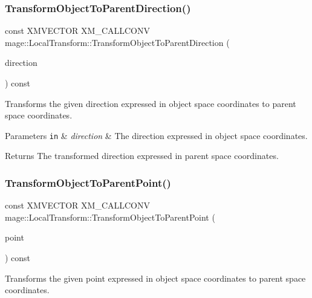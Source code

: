 \subsubsection{\texorpdfstring{Transform\+Object\+To\+Parent\+Direction()}{TransformObjectToParentDirection()}}
{\footnotesize\ttfamily const X\+M\+V\+E\+C\+T\+OR X\+M\+\_\+\+C\+A\+L\+L\+C\+O\+NV mage\+::\+Local\+Transform\+::\+Transform\+Object\+To\+Parent\+Direction (\begin{DoxyParamCaption}\item[{F\+X\+M\+V\+E\+C\+T\+OR}]{direction }\end{DoxyParamCaption}) const\hspace{0.3cm}{\ttfamily [noexcept]}}

Transforms the given direction expressed in object space coordinates to parent space coordinates.


\begin{DoxyParams}[1]{Parameters}
\mbox{\tt in}  & {\em direction} & The direction expressed in object space coordinates. \\
\hline
\end{DoxyParams}
\begin{DoxyReturn}{Returns}
The transformed direction expressed in parent space coordinates. 
\end{DoxyReturn}
\hypertarget{classmage_1_1_local_transform_a5df12629f26c4bf4d95728333d415d53}{}\label{classmage_1_1_local_transform_a5df12629f26c4bf4d95728333d415d53} 
\subsubsection{\texorpdfstring{Transform\+Object\+To\+Parent\+Point()}{TransformObjectToParentPoint()}}
{\footnotesize\ttfamily const X\+M\+V\+E\+C\+T\+OR X\+M\+\_\+\+C\+A\+L\+L\+C\+O\+NV mage\+::\+Local\+Transform\+::\+Transform\+Object\+To\+Parent\+Point (\begin{DoxyParamCaption}\item[{F\+X\+M\+V\+E\+C\+T\+OR}]{point }\end{DoxyParamCaption}) const\hspace{0.3cm}{\ttfamily [noexcept]}}

Transforms the given point expressed in object space coordinates to parent space coordinates.


